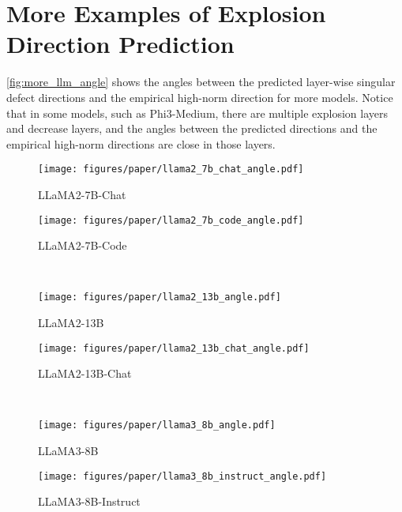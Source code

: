 \section{More Examples of Explosion Direction Prediction}\label{sec:more_explosion}

\cref{fig:more_llm_angle} shows the angles between the predicted layer-wise singular defect directions and the empirical high-norm direction for more models.
Notice that in some models, such as Phi3-Medium, there are multiple explosion layers and decrease layers, and the angles between the predicted directions and the empirical high-norm directions are close in those layers.

\begin{figure*}[!t]
    \centering
    \begin{subfigure}[t]{0.49\textwidth}
        \texttt{[image: figures/paper/llama2\_7b\_chat\_angle.pdf]}
        \caption{LLaMA2-7B-Chat}\label{fig:llama2_7b_chat_angle}
    \end{subfigure}
    \begin{subfigure}[t]{0.49\textwidth}
        \texttt{[image: figures/paper/llama2\_7b\_code\_angle.pdf]}
        \caption{LLaMA2-7B-Code}\label{fig:llama2_7b_code_angle}
    \end{subfigure}\\
    \begin{subfigure}[t]{0.49\textwidth}
        \texttt{[image: figures/paper/llama2\_13b\_angle.pdf]}
        \caption{LLaMA2-13B}\label{fig:llama2_13b_angle}
    \end{subfigure}
    \begin{subfigure}[t]{0.49\textwidth}
        \texttt{[image: figures/paper/llama2\_13b\_chat\_angle.pdf]}
        \caption{LLaMA2-13B-Chat}\label{fig:llama2_13b_chat_angle}
    \end{subfigure}\\
    \begin{subfigure}[t]{0.49\textwidth}
        \texttt{[image: figures/paper/llama3\_8b\_angle.pdf]}
        \caption{LLaMA3-8B}\label{fig:llama3_8b_angle}
    \end{subfigure}
    \begin{subfigure}[t]{0.49\textwidth}
        \texttt{[image: figures/paper/llama3\_8b\_instruct\_angle.pdf]}
        \caption{LLaMA3-8B-Instruct}\label{fig:llama3_8b_instruct_angle}
    \end{subfigure}\\

\end{figure*}
